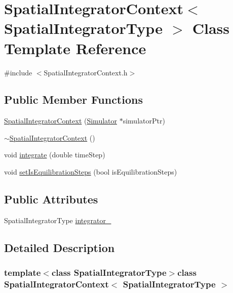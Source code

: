 \hypertarget{class_spatial_integrator_context}{\section{\-Spatial\-Integrator\-Context$<$ \-Spatial\-Integrator\-Type $>$ \-Class \-Template \-Reference}
\label{class_spatial_integrator_context}
}


{\ttfamily \#include $<$\-Spatial\-Integrator\-Context.\-h$>$}

\subsection*{\-Public \-Member \-Functions}
\begin{DoxyCompactItemize}
\item 
\hyperlink{class_spatial_integrator_context_a7bb9145d3443acadce82c9085b831ba1}{\-Spatial\-Integrator\-Context} (\hyperlink{class_simulator}{\-Simulator} $\ast$simulator\-Ptr)
\item 
\hyperlink{class_spatial_integrator_context_af87f5c5d77953464d5e4b4d42399e0cf}{$\sim$\-Spatial\-Integrator\-Context} ()
\item 
void \hyperlink{class_spatial_integrator_context_a1707f4fa1a528f76849b20791b56a492}{integrate} (double time\-Step)
\item 
void \hyperlink{class_spatial_integrator_context_ae5e5f81d450f58109a6f4c73bd45c7cc}{set\-Is\-Equilibration\-Steps} (bool is\-Equilibration\-Steps)
\end{DoxyCompactItemize}
\subsection*{\-Public \-Attributes}
\begin{DoxyCompactItemize}
\item 
\-Spatial\-Integrator\-Type \hyperlink{class_spatial_integrator_context_a3d2406bf59e43eec0d574c02780922ee}{integrator\-\_\-}
\end{DoxyCompactItemize}


\subsection{\-Detailed \-Description}
\subsubsection*{template$<$class \-Spatial\-Integrator\-Type$>$class Spatial\-Integrator\-Context$<$ Spatial\-Integrator\-Type $>$}

